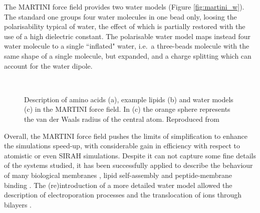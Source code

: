The MARTINI force field provides two water models (Figure \ref{fig:martini_w}). The standard one groups four water molecules in one bead only, loosing the polarisability typical of water, the effect of which is partially restored with the use of a high dielectric constant. The polarisable water model \citep{Yesylevskyy2010} maps instead four water molecule to a single ``inflated" water, i.e.\ a three-beads molecule with the same shape of a single molecule, but expanded, and a charge splitting which can account for the water dipole.
%
\begin{figure}[t!]
\centering
{} \\
%
\caption[MARTINI force field mapping for amino acids, lipids and water]{Description of amino acids (a), example lipids (b) and water models (c) in the MARTINI force field. In (c) the orange sphere represents the van der Waals radius of the central atom. Reproduced from \citet{Monticelli2008,calgary_site,Yesylevskyy2010}}
\label{fig:martini}
\end{figure}
%
Overall, the MARTINI force field pushes the limits of simplification to enhance the simulations speed-up, with considerable gain in efficiency with respect to atomistic or even SIRAH simulations. Despite it can not capture some fine details of the systems studied, it has been successfully applied to describe the behaviour of many biological membranes \citep{Khalid2019,Samsudin2017}, lipid self-assembly \citep{Marrink2007} and peptide-membrane binding \citep{Song2019}. The (re)introduction of a more detailed water model allowed the description of electroporation processes and the translocation of ions through bilayers \citep{Yesylevskyy2010}.

